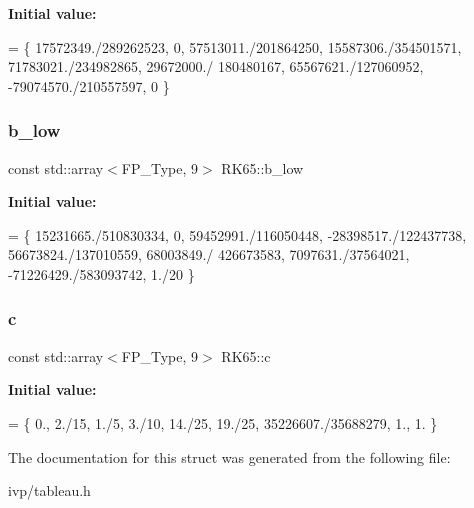 {\bfseries Initial value\+:}
\begin{DoxyCode}
= \{
    17572349./289262523,  0, 57513011./201864250, 15587306./354501571, 71783021./234982865, 29672000./
      180480167, 65567621./127060952, -79074570./210557597, 0
  \}
\end{DoxyCode}
\mbox{\label{structRK65_ad44441a4c4c7c2e0b52d3f42011445e5}} 
\subsubsection{\texorpdfstring{b\+\_\+low}{b\_low}}
{\footnotesize\ttfamily const std\+::array$<$F\+P\+\_\+\+Type, 9$>$ R\+K65\+::b\+\_\+low}

{\bfseries Initial value\+:}
\begin{DoxyCode}
= \{
    15231665./510830334, 0, 59452991./116050448, -28398517./122437738, 56673824./137010559, 68003849./
      426673583, 7097631./37564021, -71226429./583093742, 1./20
  \}
\end{DoxyCode}
\mbox{\label{structRK65_a5f2016f03bc04743bac86decbb929eeb}} 
\subsubsection{\texorpdfstring{c}{c}}
{\footnotesize\ttfamily const std\+::array$<$F\+P\+\_\+\+Type, 9$>$ R\+K65\+::c}

{\bfseries Initial value\+:}
\begin{DoxyCode}
= \{
    0., 2./15, 1./5, 3./10, 14./25, 19./25, 35226607./35688279, 1., 1.
  \}
\end{DoxyCode}


The documentation for this struct was generated from the following file\+:\begin{DoxyCompactItemize}
\item 
ivp/tableau.\+h\end{DoxyCompactItemize}
